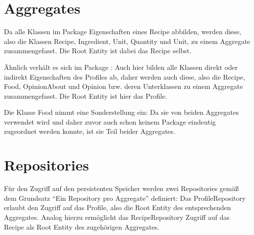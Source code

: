 \section{Aggregates}
Da alle Klassen im Package  Eigenschaften eines Recipe abbilden, werden diese, also die Klassen Recipe, Ingredient, Unit, Quantity und Unit, zu einem Aggregate zusammengefasst. Die Root Entity ist dabei das Recipe selbst.

Ähnlich verhält es sich im Package : Auch hier bilden alle Klassen direkt oder indirekt Eigenschaften des Profiles ab, daher werden auch diese, also die Recipe, Food, OpinionAbout und Opinion bzw. deren Unterklassen zu einem Aggregate zusammengefasst. Die Root Entity ist hier das Profile.

Die Klasse Food nimmt eine Sonderstellung ein: Da sie von beiden Aggregates verwendet wird und daher zuvor auch schon keinem Package eindeutig zugeordnet werden konnte, ist sie Teil beider Aggregates.

\section{Repositories}
Für den Zugriff auf den persistenten Speicher werden zwei Repositories gemäß dem Grundsatz \enquote{Ein Repository pro Aggregate} definiert: Das ProfileRepository erlaubt den Zugriff auf das Profile, also die Root Entity des entsprechenden Aggregates. Analog hierzu ermöglicht das RecipeRepository Zugriff auf das Recipe als Root Entity des zugehörigen Aggregates. 
